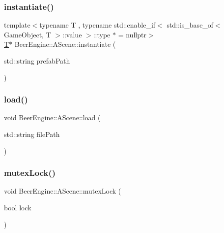 \subsubsection{\texorpdfstring{instantiate()}{instantiate()}\hspace{0.1cm}{\footnotesize\ttfamily [2/2]}}
{\footnotesize\ttfamily template$<$typename T , typename std\+::enable\+\_\+if$<$ std\+::is\+\_\+base\+\_\+of$<$ Game\+Object, T $>$\+::value $>$\+::type $\ast$  = nullptr$>$ \\
\mbox{\hyperlink{namespace_beer_engine_a94f0b552f6dc910de8cdb44207981f53a8de48e594408f9fc561b2f68ce05f664}{T}}$\ast$ Beer\+Engine\+::\+A\+Scene\+::instantiate (\begin{DoxyParamCaption}\item[{std\+::string}]{prefab\+Path }\end{DoxyParamCaption})\hspace{0.3cm}{\ttfamily [inline]}}

\mbox{\label{class_beer_engine_1_1_a_scene_aeedbe75eeef457353645d61a68bc2949}} 
\subsubsection{\texorpdfstring{load()}{load()}}
{\footnotesize\ttfamily void Beer\+Engine\+::\+A\+Scene\+::load (\begin{DoxyParamCaption}\item[{std\+::string}]{file\+Path }\end{DoxyParamCaption})}

\mbox{\label{class_beer_engine_1_1_a_scene_a5c1cc3e869d48b92331fe606eb86497c}} 
\subsubsection{\texorpdfstring{mutex\+Lock()}{mutexLock()}}
{\footnotesize\ttfamily void Beer\+Engine\+::\+A\+Scene\+::mutex\+Lock (\begin{DoxyParamCaption}\item[{bool}]{lock }\end{DoxyParamCaption})}

